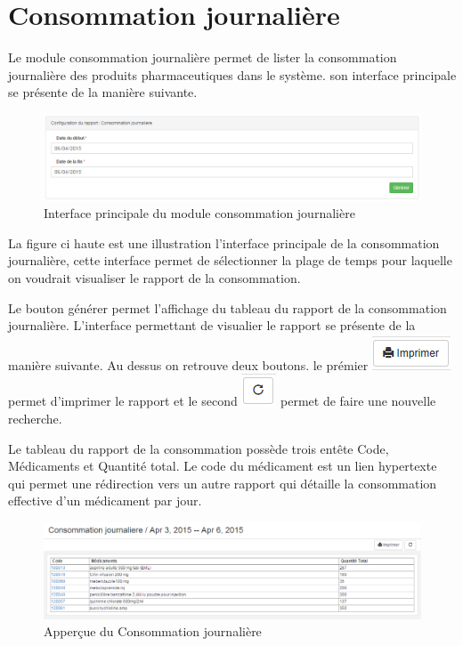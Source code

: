\documentclass[12pt,a4paper]{report}
\begin{document}
\newpage
\section{Consommation journalière}
Le module consommation journalière permet de lister la consommation journalière des produits pharmaceutiques dans le système.
son interface principale se présente de la manière suivante.

\begin{figure}[h]
\begin{center}
\includegraphics[width=14cm]{pic/ConsJour.png}
\end{center}
\caption{Interface principale du module consommation journalière}
\label{Interface principale du module consommation journalière}
\end{figure}

La figure ci haute est une illustration l'interface principale de la consommation journalière, cette interface permet de sélectionner la plage de temps pour laquelle on voudrait visualiser le rapport de la consommation. 

Le bouton générer permet l'affichage du tableau du rapport de la consommation journalière.
L'interface permettant de visualier le rapport se présente de la manière suivante. Au dessus on retrouve deux boutons. le prémier 
\includegraphics[scale=0.7]{pic/Print.png} permet d'imprimer le rapport et le second \includegraphics[scale=0.7]{pic/refresh.png} permet de faire une nouvelle recherche.

Le tableau du rapport de la consommation possède trois entête Code, Médicaments et Quantité total. Le code du médicament est un lien hypertexte qui permet une rédirection vers un autre rapport qui détaille la consommation effective d'un médicament par jour. 

\begin{figure}[h]
\begin{center}
\includegraphics[width=14cm]{pic/ConsoJournProd.png}
\end{center}
\caption{Apperçue du Consommation journalière}
\label{Apperçue du Consommation journalière}
\end{figure}
\end{document}
